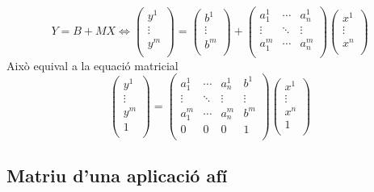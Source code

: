 \[Y=B+MX\iff\left(\begin{array}{c}
	y^1\\
	\vdots\\
	y^m\\
\end{array}\right)=\left(\begin{array}{c}
	b^1\\
	\vdots\\
	b^m\\
\end{array}\right)+\left(\begin{array}{ccc}
	a_1^1&\cdots&a_n^1\\
	\vdots&\ddots&\vdots\\
	a_1^m&\cdots&a_n^m\\
\end{array}\right)\left(\begin{array}{c}
	x^1\\
	\vdots\\
	x^n\\
\end{array}\right)\]
Això equival a la equació matricial
\[\left(\begin{array}{c}
	y^1\\
	\vdots\\
	y^m \\ \hline
	1\\
\end{array}\right)=\left(\begin{array}{ccc|c}
	a_1^1&\cdots&a_n^1&b^1\\
	\vdots&\ddots&\vdots&\vdots\\
	a_1^m&\cdots&a_n^m&b^m\\ \hline
	0&0&0&1\\
\end{array}\right)\left(\begin{array}{c}
	x^1\\
	\vdots\\
	x^n\\ \hline
	1\\
\end{array}\right)\]

\subsection{Matriu d'una aplicació afí}
\label{ss_maapaf}

